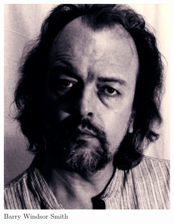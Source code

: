 \begin{frame}{}
\begin{figure}[htp]
 \centering
 \begin{subfigure}[b]{0.16\textwidth}
   \includegraphics[width=\textwidth]{img/artistas/BarryWindsorSmith}
   \caption{Barry Windsor Smith}
 \end{subfigure}
~
 \begin{subfigure}[b]{0.16\textwidth}

\end{subfigure}
\end{figure}
\end{frame}
